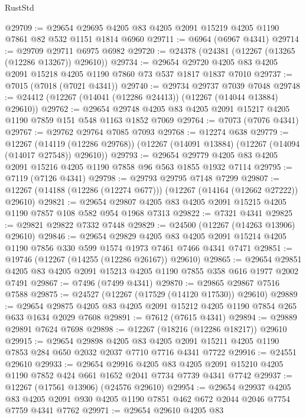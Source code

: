 \begin{lexlean}{RustStd}
\begin{coremodule}
@29709 := @29654 @29695 @4205 @83 @4205 @2091 @15219 @4205 @1190 @7861 @82 @532 @1151 @1814 @6960
@29711 := @6964 (@6967 @4341)
@29714 := @29709 @29711 @6975 @6982
@29720 := @24378 (@24381 (@12267 (@13265 (@12286 @13267)) @29610))
@29734 := @29654 @29720 @4205 @83 @4205 @2091 @15218 @4205 @1190 @7860 @73 @537 @1817 @1837 @7010
@29737 := @7015 (@7018 (@7021 @4341))
@29740 := @29734 @29737 @7039 @7048
@29748 := @24412 (@12267 (@14041 (@12286 @24413)) (@12267 (@14044 @13884) @29610))
@29762 := @29654 @29748 @4205 @83 @4205 @2091 @15217 @4205 @1190 @7859 @151 @548 @1163 @1852 @7069
@29764 := @7073 (@7076 @4341)
@29767 := @29762 @29764 @7085 @7093
@29768 := @12274 @638
@29779 := @12267
    (@14119 (@12286 @29768))
    (@12267 (@14091 @13884) (@12267 (@14094 (@14017 @27548)) @29610))
@29793 := @29654 @29779 @4205 @83 @4205 @2091 @15216 @4205 @1190 @7858 @96 @563 @1855 @1932 @7114
@29795 := @7119 (@7126 @4341)
@29798 := @29793 @29795 @7148 @7299
@29807 := @12267 (@14188 (@12286 (@12274 @677))) (@12267 (@14164 (@12662 @27222)) @29610)
@29821 := @29654 @29807 @4205 @83 @4205 @2091 @15215 @4205 @1190 @7857 @108 @582 @954 @1968 @7313
@29822 := @7321 @4341
@29825 := @29821 @29822 @7332 @7448
@29829 := @24500 (@12267 (@14263 @13906) @29610)
@29846 := @29654
    @29829
    @4205
    @83
    @4205
    @2091
    @15214
    @4205
    @1190
    @7856
    @330
    @599
    @1574
    @1973
    @7461
    @7466
    @4341
    @7471
@29851 := @19746 (@12267 (@14255 (@12286 @26167)) @29610)
@29865 := @29654 @29851 @4205 @83 @4205 @2091 @15213 @4205 @1190 @7855 @358 @616 @1977 @2002 @7491
@29867 := @7496 (@7499 @4341)
@29870 := @29865 @29867 @7516 @7588
@29875 := @24527 (@12267 (@17529 (@14120 @17530)) @29610)
@29889 := @29654 @29875 @4205 @83 @4205 @2091 @15212 @4205 @1190 @7854 @265 @633 @1634 @2029 @7608
@29891 := @7612 (@7615 @4341)
@29894 := @29889 @29891 @7624 @7698
@29898 := @12267 (@18216 (@12286 @18217)) @29610
@29915 := @29654
    @29898
    @4205
    @83
    @4205
    @2091
    @15211
    @4205
    @1190
    @7853
    @284
    @650
    @2032
    @2037
    @7710
    @7716
    @4341
    @7722
@29916 := @24551 @29610
@29933 := @29654
    @29916
    @4205
    @83
    @4205
    @2091
    @15210
    @4205
    @1190
    @7852
    @424
    @661
    @1652
    @2041
    @7734
    @7739
    @4341
    @7742
@29937 := @12267 (@17561 @13906) (@24576 @29610)
@29954 := @29654
    @29937
    @4205
    @83
    @4205
    @2091
    @930
    @4205
    @1190
    @7851
    @462
    @672
    @2044
    @2046
    @7754
    @7759
    @4341
    @7762
@29971 := @29654
    @29610
    @4205
    @83

\end{coremodule}
\end{lexlean}
